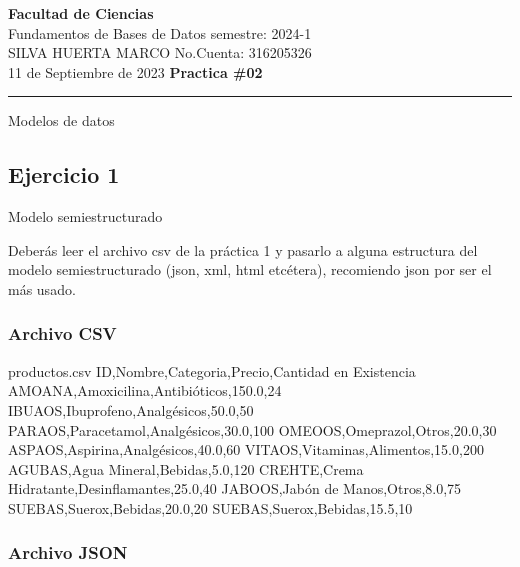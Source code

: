 \documentclass[a4paper,12pt]{article}
\begin{document}
\pagecolor{black}
\color{white}

\thispagestyle{firstpage} %
\noindent
\large\textbf{Facultad de Ciencias} \\
Fundamentos de Bases de Datos \hfill semestre: 2024-1 \\
\textsc{SILVA HUERTA MARCO}   \hfill No.Cuenta: 316205326    \\
11 de Septiembre de 2023      \hfill \textbf{Practica \#02}    \\
\noindent\rule{7.3in}{2.8pt}

\begin{center}
\Large{Modelos de datos}
\end{center}



\subsection*{Ejercicio 1}

Modelo semiestructurado

\textcolor{sun}{Deberás leer el archivo csv de la práctica 1 y pasarlo a alguna estructura del modelo
semiestructurado (json, xml, html etcétera), recomiendo json por ser el más usado.}


\subsubsection*{Archivo CSV}

\begin{filecontents*}{productos.csv}
    ID,Nombre,Categoria,Precio,Cantidad en Existencia
    AMOANA,Amoxicilina,Antibióticos,150.0,24
    IBUAOS,Ibuprofeno,Analgésicos,50.0,50
    PARAOS,Paracetamol,Analgésicos,30.0,100
    OMEOOS,Omeprazol,Otros,20.0,30
    ASPAOS,Aspirina,Analgésicos,40.0,60
    VITAOS,Vitaminas,Alimentos,15.0,200
    AGUBAS,Agua Mineral,Bebidas,5.0,120
    CREHTE,Crema Hidratante,Desinflamantes,25.0,40
    JABOOS,Jabón de Manos,Otros,8.0,75
    SUEBAS,Suerox,Bebidas,20.0,20
    SUEBAS,Suerox,Bebidas,15.5,10
\end{filecontents*}


\subsubsection*{Archivo JSON}
\end{document}
